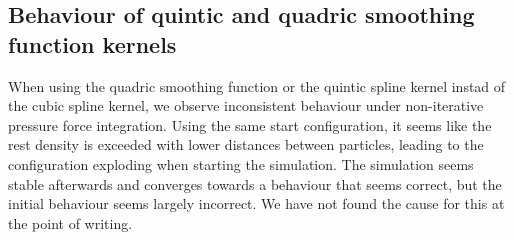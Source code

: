 \documentclass{ACGSeminar}
\begin{document}
\subsection{Behaviour of quintic and quadric smoothing function kernels}

When using the quadric smoothing function or the quintic spline kernel instad of the cubic spline kernel, we observe inconsistent behaviour under non-iterative pressure force integration. Using the same start configuration, it seems like the rest density is exceeded with lower distances between particles, leading to the configuration exploding when starting the simulation. The simulation seems stable afterwards and converges towards a behaviour that seems correct, but the initial behaviour seems largely incorrect. We have not found the cause for this at the point of writing.




\printbibliography
\cleardoublepage
\end{document}
